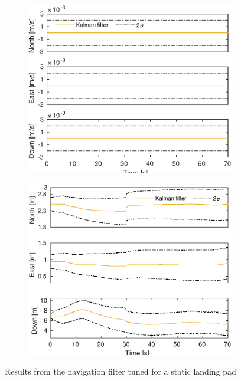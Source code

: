 \begin{figure}
	\begin{subfigure}{.49\textwidth}
		\includegraphics[width=\textwidth]{img/plot/static/kalmanTuningStaticVel.eps}
		\label{fig:kalmanTuningStaticVel}
	\end{subfigure}
	\begin{subfigure}{.49\textwidth}
		\includegraphics[width=\textwidth]{img/plot/static/kalmanTuningStaticBias.eps}
		\label{fig:kalmanTuningStaticBias}
	\end{subfigure}
	\caption{Results from the navigation filter tuned for a static landing pad}\label{fig:kalmanTuningStaticTotal}
\end{figure}
